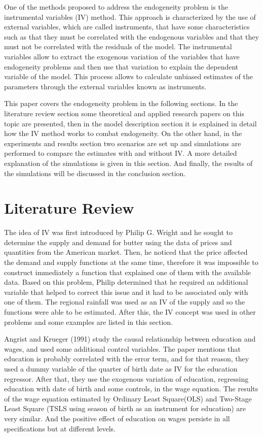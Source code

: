 \documentclass{article}
\begin{document}
One of the methods proposed to address the endogeneity problem is the instrumental variables (IV) method. This approach is characterized by the use of external variables, which are called instruments, that have some characteristics such as that they must be correlated with the endogenous variables and that they must not be correlated with the residuals of the model. The instrumental variables allow to extract the exogenous variation of the variables that have endogeneity problems and then use that variation to explain the dependent variable of the model. This process allows to calculate unbiased estimates of the parameters through the external variables known as instruments.


This paper covers the endogeneity problem in the following sections. In the literature review section some theoretical and applied research papers on this topic are presented, then in the model description section it is explained in detail how the IV method works to combat endogeneity. On the other hand, in the experiments and results section two scenarios are set up and simulations are performed to compare the estimates with and without IV. A more detailed explanation of the simulations is given in this section. And finally, the results of the simulations will be discussed in the conclusion section.


\section{Literature Review}
The idea of IV was first introduced by Philip G. Wright and he sought to determine the supply and demand for butter using the data of prices and quantities from the American market. Then, he noticed that the price affected the demand and supply functions at the same time, therefore it was impossible to construct immediately a function that explained one of them with the available data.
Based on this problem, Philip determined that he required an additional variable that helped to correct this issue and it had to be associated only with one of them. The regional rainfall was used as an IV of the supply and so the functions were able to be estimated. After this, the IV concept was used in other problems and some examples are listed in this section.

Angrist and Krueger (1991) study the causal relationship between education and wages, and used some additional control variables. The paper mentions that education is probably correlated with the error term, and for that reason, they used a dummy variable of the quarter of birth date as IV for the education regressor. After that, they use the exogenous variation of education, regressing education with date of birth and some controls, in the wage equation.
The results of the wage equation estimated by Ordinary Least Square(OLS) and Two-Stage Least Square (TSLS using season of birth as an instrument for education) are very similar. And the positive effect of education on wages persiste in all specifications but at different levels.
\end{document}
